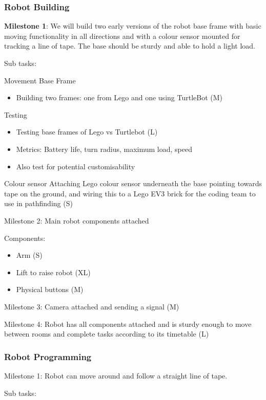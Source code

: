 \documentclass{article}
\begin{document}
\subsubsection{Robot Building}

{\bf Milestone 1}: We will build two early versions of the robot base frame with basic moving functionality in all directions and with a colour sensor mounted for tracking a line of tape. The base should be sturdy and able to hold a light load. 

Sub tasks:

Movement Base Frame
\begin{itemize}
\item Building two frames: one from Lego and one using TurtleBot (M)
\end{itemize}
Testing
\begin{itemize}
\item Testing base frames of Lego vs Turtlebot (L)
\item Metrics: Battery life, turn radius, maximum load, speed
\item Also test for potential customisability
\end{itemize}
    
Colour sensor
    Attaching Lego colour sensor underneath the base pointing towards tape on the ground, and wiring this to a Lego EV3 brick for the       coding team to use in pathfinding (S)
    
Milestone 2: Main robot components attached

Components:
\begin{itemize}
\item Arm (S)
\item Lift to raise robot (XL)
\item Physical buttons (M)
\end{itemize}
    
Milestone 3: Camera attached and sending a signal (M)

Milestone 4: Robot has all components attached and is sturdy enough to move between rooms and complete tasks according to its timetable (L) 


\subsubsection{Robot Programming}

Milestone 1: Robot can move around and follow a straight line of tape.

Sub tasks: 
\end{document}

